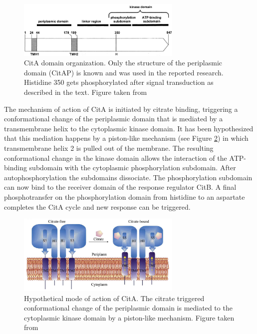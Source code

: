\documentclass[english, a4paper, 12pt, titlepage, draft]{article}
\begin{document}
\begin{figure}
    \centering
    \includegraphics[width=0.7\textwidth]{figures/CitA_organization.png}
    \caption{CitA domain organization. Only the structure of the periplasmic domain (CitAP) is known and was used in the reported research. Histidine 350 gets phosphorylated after signal transduction as described in the text. Figure taken from \cite{CitA_original}}
    \label{fig:CitA_organization}
\end{figure}   


The mechanism of action of CitA \cite{CitA_original} is initiated by citrate binding, triggering a conformational change of the periplasmic domain that is mediated by a transmembrane helix to the cytoplasmic kinase domain.
It has been hypothesized that this mediation happens by a piston-like mechanism (see Figure \ref{fig:CitA_mechanism}) in which transmembrane helix 2 is pulled out of the membrane.
The resulting conformational change in the kinase domain allows the interaction of the ATP-binding subdomain with the cytoplasmic phosphorylation subdomain.
After autophosphorylation the subdomains dissociate.
The phosphorylation subdomain can now bind to the receiver domain of the response regulator CitB.
A final phosphotransfer on the phosphorylation domain from histidine to an aspartate completes the CitA cycle and new response can be triggered.


\begin{figure}
    \centering
    \includegraphics[width=0.7\textwidth]{figures/CitA_mechanism.png}
    \caption{Hypothetical mode of action of CitA. The citrate triggered conformational change of the periplasmic domain is mediated to the cytoplasmic kinase domain by a piston-like mechanism. Figure taken from \cite{CitA_2J80}}
    \label{fig:CitA_mechanism}
\end{figure}    
\end{document}
